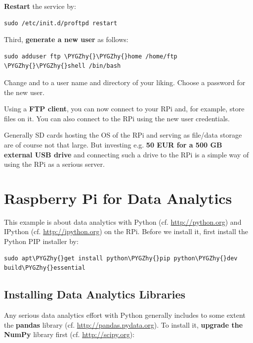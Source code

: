 \documentclass[letterpaper,10pt,english]{sphinxmanual}
\def\PYGZhy{\char`\-}
\begin{document}
\textbf{Restart} the service by:

\begin{Verbatim}[commandchars=\\\{\}]
sudo /etc/init.d/proftpd restart
\end{Verbatim}

Third, \textbf{generate a new user} as follows:

\begin{Verbatim}[commandchars=\\\{\}]
sudo adduser ftp \PYGZhy{}\PYGZhy{}home /home/ftp \PYGZhy{}\PYGZhy{}shell /bin/bash
\end{Verbatim}

Change  and  to a user name and directory of your liking. Choose a password for the new user.

Using a \textbf{FTP client}, you can now connect to your RPi and, for example, store files on it. You can also  connect to the RPi using the new user credentials.

Generally SD cards hosting the OS of the RPi and serving as file/data storage are of course not that large. But investing e.g. \textbf{50 EUR for a 500 GB external USB drive} and connecting such a drive to the RPi is a simple way of using the RPi as a serious  server.


\section{Raspberry Pi for Data Analytics}
\label{02_data_analytics:raspberry-pi-for-data-analytics}\label{02_data_analytics::doc}
This example is about data analytics with Python (cf. \href{http://python.org}{http://python.org}) and IPython (cf. \href{http://ipython.org}{http://ipython.org}) on the RPi. Before we install it, first install the Python PIP installer by:

\begin{Verbatim}[commandchars=\\\{\}]
sudo apt\PYGZhy{}get install python\PYGZhy{}pip python\PYGZhy{}dev build\PYGZhy{}essential
\end{Verbatim}


\subsection{Installing Data Analytics Libraries}
\label{02_data_analytics:installing-data-analytics-libraries}
Any serious data analytics effort with Python generally includes to some extent the \textbf{pandas} library (cf. \href{http://pandas.pydata.org}{http://pandas.pydata.org}). To install it, \textbf{upgrade the NumPy} library first (cf. \href{http://scipy.org}{http://scipy.org}):
\end{document}

